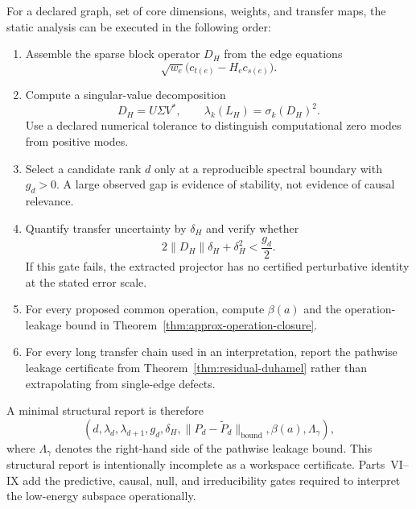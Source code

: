 For a declared graph, set of core dimensions, weights, and transfer maps, the
static analysis can be executed in the following order:
\begin{enumerate}
\item Assemble the sparse block operator \(D_H\) from the edge equations
\[
\sqrt{w_e}\bigl(c_{t(e)}-H_ec_{s(e)}\bigr).
\]
\item Compute a singular-value decomposition
\[
D_H=U\Sigma V^*,
\qquad
\lambda_k(L_H)=\sigma_k(D_H)^2.
\]
Use a declared numerical tolerance to distinguish computational zero modes
from positive modes.
\item Select a candidate rank \(d\) only at a reproducible spectral boundary
with \(g_d>0\). A large observed gap is evidence of stability, not evidence of
causal relevance.
\item Quantify transfer uncertainty by \(\delta_H\) and verify whether
\[
2\|D_H\|\delta_H+\delta_H^2<\frac{g_d}{2}.
\]
If this gate fails, the extracted projector has no certified perturbative
identity at the stated error scale.
\item For every proposed common operation, compute \(\beta(a)\) and the
operation-leakage bound in Theorem~\ref{thm:approx-operation-closure}.
\item For every long transfer chain used in an interpretation, report the
pathwise leakage certificate from Theorem~\ref{thm:residual-duhamel} rather
than extrapolating from single-edge defects.
\end{enumerate}

A minimal structural report is therefore
\[
\boxed{
\left(
 d,\lambda_d,\lambda_{d+1},g_d,
 \delta_H,
 \|P_d-\widetilde P_d\|_{\mathrm{bound}},
 \beta(a),
 \Lambda_\gamma
\right),
}
\]
where \(\Lambda_\gamma\) denotes the right-hand side of the pathwise leakage
bound. This structural report is intentionally incomplete as a workspace
certificate. Parts~VI--IX add the predictive, causal, null, and irreducibility
gates required to interpret the low-energy subspace operationally.
